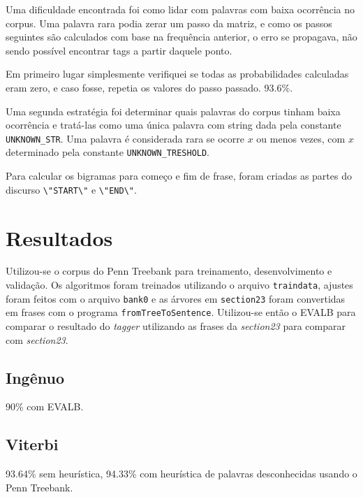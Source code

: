 \message{ !name(relatorio.tex)}\documentclass[12pt, a4paper]{article}
\newcommand{\code}[1]{{\lstinline{#1}}}
\begin{document}
Uma dificuldade encontrada foi como lidar com palavras com baixa ocorrência no
corpus. Uma palavra rara podia zerar um passo da matriz, e como os passos
seguintes são calculados com base na frequência anterior, o erro se propagava,
não sendo possível encontrar tags a partir daquele ponto.

Em primeiro lugar simplesmente verifiquei se todas as probabilidades calculadas
eram zero, e caso fosse, repetia os valores do passo passado. 93.6\%.

Uma segunda estratégia foi determinar quais palavras do corpus tinham baixa
ocorrência e tratá-las como uma única palavra com string dada pela constante
\code{UNKNOWN_STR}. Uma palavra é considerada rara se ocorre $ x $ ou menos
vezes, com $ x $ determinado pela constante \code{UNKNOWN_TRESHOLD}.

Para calcular os bigramas para começo e fim de frase, foram criadas as partes do
discurso \code{\"START\"} e \code{\"END\"}.

\section{Resultados}
Utilizou-se o corpus do Penn Treebank para treinamento, desenvolvimento e
validação. Os algoritmos foram treinados utilizando o arquivo \code{traindata},
ajustes foram feitos com o arquivo \code{bank0} e as árvores em \code{section23}
foram convertidas em frases com o programa \code{fromTreeToSentence}.
Utilizou-se então o EVALB para comparar o resultado do \emph{tagger} utilizando
as frases da \emph{section23} para comparar com \emph{section23}.

\subsection{Ingênuo}
90\% com EVALB.

\subsection{Viterbi}
93.64\% sem heurística, 94.33\% com heurística de palavras desconhecidas usando o Penn Treebank.
\end{document}
